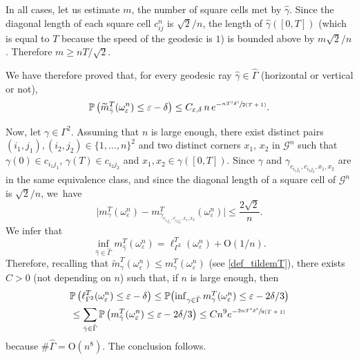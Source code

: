 \documentclass[JEP,XML,SOM,Unicode, NoEqCountersInSection,NoFloatCountersInSection,published]{cedram}
\theoremstyle{definition}
\begin{document}
{In all cases, let us estimate $m$, the number of square cells met by $\hat \gamma$.
Since the diagonal length of each square cell $c_{ij}^n$ is $\sqrt{2}/n$, the length of $\hat\gamma([0,T])$ (which is equal to $T$ because the speed of the geodesic is $1$) is bounded above by $m\sqrt{2}/n$. Therefore $m\geq nT/\sqrt{2}$.

We have therefore proved that, for every geodesic ray $\hat \gamma\in\hat\Gamma$ (horizontal or vertical or not),
\begin{equation}\label{semicont21800}
\mathbb{P}\left( \widetilde m_{\hat \gamma}^T(\omega_\varepsilon^n) \leq \varepsilon-\delta \right) \leq C_{\varepsilon, \delta} \, {n} \, {e^{-\sfrac{nT^2 \delta^2}{2(T+1)}} }.
\end{equation}
}

Now, let $\gamma\in \Gamma^2$. {Assuming that $n$ is large enough,} there exist {distinct pairs} $(i_1,j_1),(i_2,j_2)\in \{1,\ldots,n\}^2$ and two {distinct} corners $x_1$, $x_2$ in $\mathcal{G}^n$ such that $\gamma(0)\in c_{i_1j_1}$, $\gamma(T)\in c_{i_2j_2}$ and $x_1,x_2\in \gamma([0,T])$.
{Since $\gamma$ and $\gamma_{c_{i_1j_1},c_{i_2j_2},x_1,x_2}$ are in the same equivalence class, and} since the diagonal length of a square cell of $\mathcal{G}^n$ is $\sqrt{2}/n$, we~have
\[
\bigl| m^T_{\gamma}(\omega_\varepsilon^n)- m^T_{\gamma_{c_{i_1j_1},c_{i_2j_2},x_1,x_2}}(\omega_\varepsilon^n) \bigr|\leq \frac{2\sqrt{2}}{n}.
\]
We infer that
\[
\inf_{\hat\gamma\in \hat \Gamma} m^T_{\hat\gamma}(\omega_\varepsilon^n)=\ell_{\Gamma^2}^T(\omega_\varepsilon^n)+\mathrm{O}(1/n).
\]
Therefore, recalling that $\widetilde m^T_\gamma(\omega_\varepsilon^n) \leq m^T_\gamma(\omega_\varepsilon^n)$ (see \eqref{def_tildemT}),
there exists $C>0$ (not depen\-ding on $n$) such that, if $n$ is large enough, then
\begin{multline*}
\mathbb{P}\left( \ell_{\Gamma^2}^T(\omega_\varepsilon^n)\leq \varepsilon-\delta\right) \leq \mathbb{P}\bigl({\textstyle\inf_{\gamma\in \hat \Gamma} m^T_\gamma(\omega_\varepsilon^n)\leq \varepsilon -2\delta/3}\bigr) \\
\leq \sum_{\hat\gamma\in \hat \Gamma}\mathbb{P}\left(m^T_{\hat\gamma}(\omega_\varepsilon^n)\leq \varepsilon -2\delta/3\right)\leq C n^9 {e^{-\sfrac{2nT^2 \delta^2}{9(T+1)}} }
\end{multline*}
because $\#\hat \Gamma=\mathrm{O} (n^8)$. The conclusion follows.

\label{sec:LD}
\end{document}
